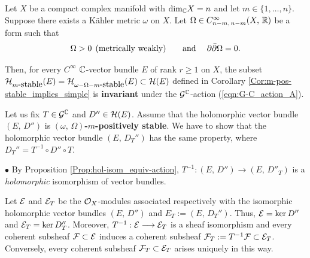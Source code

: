 \documentclass[12pt]{article}
\begin{document}
\begin{Prop}\label{Prop:m-pos-stability_G-C-action_invariance} Let $X$ be a compact complex manifold with $\mbox{dim}_{\mathbb{C}} X =n$ and let $m\in\{1,\dots , n\}$. Suppose there exists a K\"ahler metric $\omega$ on $X$. Let $\Omega\in C^\infty_{n-m,\,n-m}(X,\,\mathbb{R})$ be a form such that \begin{eqnarray*}\Omega>0 \hspace{1ex} \mbox{(metrically weakly) \hspace{3ex} and} \hspace{3ex} \partial\bar\partial\Omega = 0.\end{eqnarray*}

  Then, for every $C^\infty$ $\mathbb{C}$-vector bundle $E$ of rank $r\geq 1$ on $X$, the subset ${\cal H}_{m\mbox{-stable}}(E) = {\cal H}_{\omega-\Omega-m\mbox{-stable}}(E)\subset{\cal H}(E)$ defined in Corollary \ref{Cor:m-pos-stable_implies_simple} is {\bf invariant} under the ${\cal G}^{\mathbb{C}}$-action (\ref{eqn:G-C_action_A}).


\end{Prop}  


 Let us fix $T\in{\cal G}^{\mathbb{C}}$ and $D''\in{\cal H}(E)$. Assume that the holomorphic vector bundle $(E,\,D'')$ is {\bf $(\omega,\,\Omega)$-$m$-positively stable}. We have to show that the holomorphic vector bundle $(E,\,D_T'')$ has the same property, where $D_T'' = T^{-1}\circ D''\circ T$.

\vspace{1ex}

$\bullet$ By Proposition \ref{Prop:hol-isom_equiv-action}, $T^{-1}:(E,\,D'')\longrightarrow(E,\,D''_T)$ is a {\it holomorphic} isomorphism of vector bundles. 

Let ${\cal E}$ and ${\cal E}_T$ be the ${\cal O}_X$-modules associated respectively with the isomorphic holomorphic vector bundles $(E,\,D'')$ and $E_T:=(E,\,D_T'')$. Thus, ${\cal E} = \ker D''$ and ${\cal E}_T = \ker D''_T$. Moreover, $T^{-1}:{\cal E}\longrightarrow{\cal E}_T$ is a sheaf isomorphism and every coherent subsheaf ${\cal F}\subset{\cal E}$ induces a coherent subsheaf ${\cal F}_T:=T^{-1}{\cal F}\subset{\cal E}_T$. Conversely, every coherent subsheaf ${\cal F}_T\subset{\cal E}_T$ arises uniquely in this way. 
\end{document}
